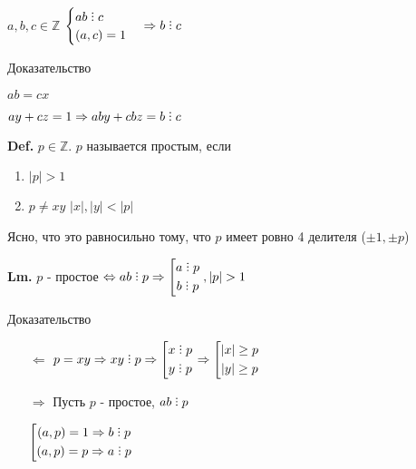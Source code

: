 \documentclass[14pt, letter paper]{article}
\def\divby{%
  \mathrel{\text{\vbox{\baselineskip.65ex\lineskiplimit0pt\hbox{.}\hbox{.}\hbox{.}}}}%
}
\begin{document}
$a, b, c \in \mathds{Z}$ $\begin{cases} ab \divby c \\ (a, c) = 1 \end{cases} \Rightarrow b \divby c$

\begin{center}
    Доказательство
\end{center}

$ab = cx$

$ay + cz = 1 \Rightarrow aby + cbz = b \divby c$

\textbf{Def.} $p \in \mathds{Z}$. $p$ называется простым, если

\begin{enumerate}
    \item $|p| > 1$
    \item $p \neq xy$ $|x|, |y| < |p|$
\end{enumerate}

Ясно, что это равносильно тому, что $p$ имеет ровно 4 делителя ($\pm 1, \pm p$)

\textbf{Lm.} $p$ - простое $\Leftrightarrow ab \divby p \Rightarrow \left [ \begin{gathered} a \divby p \\ b \divby p \end{gathered} \right. , |p| > 1$

\begin{center}
    Доказательство
\end{center}

\begin{itemize}
    \item[$\Leftarrow$] $p = xy \Rightarrow xy \divby p \Rightarrow \left [ \begin{gathered} x \divby p \\ y \divby p \end{gathered} \right. \Rightarrow \left [ \begin{gathered} |x| \geq p \\ |y| \geq p \end{gathered} \right.$ 

    \item[$\Rightarrow$] Пусть $p$ - простое, $ab \divby p$

    $\left [ \begin{gathered} (a, p) = 1 \Rightarrow b \divby p\\ (a, p) = p \Rightarrow a \divby p\end{gathered} \right.$
\end{itemize}
\end{document}
